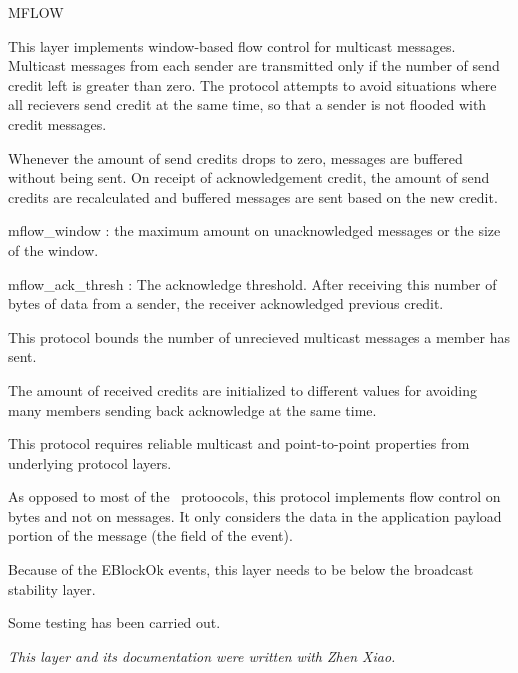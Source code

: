 %
%
%
\begin{Layer}{MFLOW} 

This layer implements window-based flow control for multicast messages.
Multicast messages from each sender are transmitted only if the number of send
credit left is greater than zero.  The protocol attempts to avoid situations
where all recievers send credit at the same time, so that a sender is not
flooded with credit messages.

\begin{Protocol}
Whenever the amount of send credits drops to zero, messages are buffered without
being sent.  On receipt of acknowledgement credit, the amount of send credits
are recalculated and buffered messages are sent based on the new credit.
\end{Protocol}

\begin{Parameters}
\item mflow\_window : the maximum amount on unacknowledged messages or the size of the
window.
\item mflow\_ack\_thresh : The acknowledge threshold.  After receiving this number of
bytes of data from a sender, the receiver acknowledged previous credit.
\end{Parameters}

\begin{Properties}
\item
This protocol bounds the number of unrecieved multicast messages a member has
sent.
\item
The amount of received credits are initialized to different values for
avoiding many members sending back acknowledge at the same time. 
\item
This protocol requires reliable multicast and point-to-point properties from
underlying protocol layers.
\end{Properties}

\begin{Notes}
\item
As opposed to most of the \ensemble\ protoocols, this protocol implements flow
control on bytes and not on messages.  It only considers the data in the
application payload portion of the message (the  field of the
event).
\item
Because of the EBlockOk events, this layer needs to be below the
broadcast stability layer.
\end{Notes}

\begin{Sources}
\end{Sources}

\begin{Testing}
\item
Some testing has been carried out.
\end{Testing}

\emph{This layer and its documentation were written with Zhen Xiao.}
\end{Layer}
